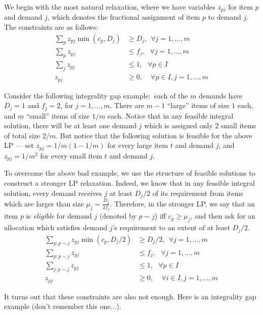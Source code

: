 We begin with the most natural relaxation, where we have variables $z_{pj}$ for item $p$ and demand $j$, which denotes the fractional assignment of item $p$ to demand $j$. The constraints are as follows:
\begin{align*}
\sum_{p} z_{pj} \min(c_p, D_j) & \geq D_j, \ \  \forall j=1, \ldots, m \\
\sum_p z_{pj} & \leq f_j, \ \ \ \forall j = 1, \ldots, m \\
\sum_j z_{pj} & \leq 1,  \ \ \ \forall p \in I \\
z_{pj} & \geq 0, \ \ \ \ \ \forall p \in I, j = 1, \ldots, m
\end{align*}

Consider the following integrality gap example:~each of the $m$ demands have $D_j = 1$ and $f_j = 2$, for $j=1, \ldots, m$. There are $m-1$ ``large'' items of size $1$ each,
 and $m$ ``small'' items of size $1/m$ each. Notice that in any feasible integral solution, there will be at least one demand $j$ which is assigned only $2$ small items of total size $2/m$. But notice that the following solution is feasible for the above LP --- set $z_{pj} = 1/m (1-1/m)$ for every large item $t$ and demand $j$, and $z_{pj} = 1/m^2$ for every small item $t$ and demand $j$.

To overcome the above bad example, we use the structure of feasible solutions to construct a stronger LP relaxation. Indeed, we know that in any feasible integral solution, every demand receives $j$ at least $D_j/2$ of its requirement from items which are larger than size $\mu_j = \frac{D_j}{2f_j}$. Therefore, in the stronger LP, we say that an item $p$ is \emph{eligible} for demand $j$ (denoted by $p \sim j$) iff $c_p \geq \mu_j$, and then ask for an allocation which satisfies demand $j$'s requirement to an extent of at least $D_j/2$.
\begin{align*}
\sum_{p: p \sim j} z_{pj} \min(c_p, D_j/2) & \geq D_j/2, \ \  \forall j=1, \ldots, m \\
\sum_{p: p \sim j} z_{pj} & \leq f_j, \ \ \ \forall j = 1, \ldots, m \\
\sum_{j: p \sim j} z_{pj} & \leq 1,  \ \ \ \forall p \in I\\
z_{pj} & \geq 0, \ \ \ \ \ \forall i \in I,j=1, \ldots, m
\end{align*}

It turns out that these constraints are also not enough. Here is an integrality gap example (don't remember this one...).
\fi
\newcommand{\barD}{{\bar D}}

